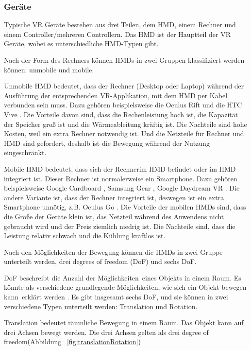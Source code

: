   \subsubsection{Geräte}
  Typische VR Geräte bestehen aus drei Teilen, dem HMD, einem Rechner und einem Controller/mehreren Controllern. Das HMD ist der Hauptteil der VR Geräte, wobei es unterschiedliche HMD-Typen gibt.
  
  Nach der Form des Rechners können HMDs in zwei Gruppen klassifiziert werden können: unmobile und mobile.
  
  Unmobile HMD bedeutet, dass der Rechner (Desktop oder Laptop) während der Ausführung der entsprechenden VR-Applikation, mit dem HMD per Kabel verbunden sein muss. Dazu gehören beispielsweise die Oculus Rift \citep{31} und die HTC Vive \citep{32}. Die Vorteile davon sind, dass die Rechenleistung hoch ist, die Kapazität der Speicher groß ist und die Wärmeableitung kräftig ist. Die Nachteile sind hohe Kosten, weil ein extra Rechner notwendig ist. Und die Netzteile für Rechner und HMD sind gefordert, deshalb ist die Bewegung während der Nutzung eingeschränkt.
  
  Mobile HMD bedeutet, dass sich der \glqq Rechner\grqq im HMD befindet oder im HMD integriert ist. Dieser Rechner ist normalerweise ein Smartphone. Dazu gehören beispielsweise Google Cardboard \citep{33}, Samsung Gear  \citep{34}, Google Daydream VR \citep{35}. Die andere Variante ist, dass der Rechner integriert ist, deswegen ist ein extra Smartphone unnötig, z.B. Oculus Go \citep{36}. Die Vorteile der mobilen HMDs sind, dass die Größe der Geräte klein ist, das Netzteil während des Anwendens nicht gebraucht wird und der Preis ziemlich niedrig ist. Die Nachteile sind, dass die Leistung relativ schwach und die Kühlung kraftlos ist.
  
  Nach den Möglichkeiten der Bewegung können die HMDs in zwei Gruppe unterteilt werden, drei degrees of freedom (DoF) und sechs DoF.
  
  DoF beschreibt die \glqq Anzahl der Möglichkeiten\grqq\ eines Objekts in einem Raum. Es könnte als \glqq verschiedene grundlegende Möglichkeiten, wie sich ein Objekt bewegen kann\grqq\ erklärt werden \citep{25}. Es gibt insgesamt sechs DoF, und sie können in zwei verschiedene Typen unterteilt werden: Translation und Rotation.
  
  Translation bedeutet räumliche Bewegung in einem Raum. Das Objekt kann auf drei Achsen bewegt werden. Die drei Achsen gelten als drei \glqq degree of freedom\grqq\. (Abbildung ~\ref{fig:translationRotation})
  
